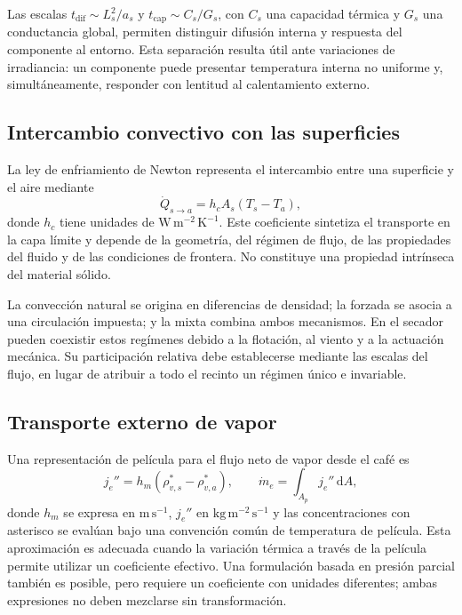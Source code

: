 Las escalas $t_{\mathrm{dif}}\sim L_s^2/a_s$ y $t_{\mathrm{cap}}\sim C_s/G_s$, con $C_s$ una capacidad térmica y $G_s$ una conductancia global, permiten distinguir difusión interna y respuesta del componente al entorno. Esta separación resulta útil ante variaciones de irradiancia: un componente puede presentar temperatura interna no uniforme y, simultáneamente, responder con lentitud al calentamiento externo.

\subsection{Intercambio convectivo con las superficies}

La ley de enfriamiento de Newton representa el intercambio entre una superficie y el aire mediante
\begin{equation}
\dot Q_{s\rightarrow a}=h_c A_s(T_s-T_a),
\label{eq:newton}
\end{equation}
donde $h_c$ tiene unidades de $\mathrm{W\,m^{-2}\,K^{-1}}$. Este coeficiente sintetiza el transporte en la capa límite y depende de la geometría, del régimen de flujo, de las propiedades del fluido y de las condiciones de frontera. No constituye una propiedad intrínseca del material sólido.

La convección natural se origina en diferencias de densidad; la forzada se asocia a una circulación impuesta; y la mixta combina ambos mecanismos. En el secador pueden coexistir estos regímenes debido a la flotación, al viento y a la actuación mecánica. Su participación relativa debe establecerse mediante las escalas del flujo, en lugar de atribuir a todo el recinto un régimen único e invariable.

\subsection{Transporte externo de vapor}

Una representación de película para el flujo neto de vapor desde el café es
\begin{equation}
j_e''=h_m\left(\rho_{v,s}^{*}-\rho_{v,a}^{*}\right),
\qquad
\dot m_e=\int_{A_p}j_e''\,\mathrm{d}A,
\label{eq:flujo_evaporacion}
\end{equation}
donde $h_m$ se expresa en $\mathrm{m\,s^{-1}}$, $j_e''$ en $\mathrm{kg\,m^{-2}\,s^{-1}}$ y las concentraciones con asterisco se evalúan bajo una convención común de temperatura de película. Esta aproximación es adecuada cuando la variación térmica a través de la película permite utilizar un coeficiente efectivo. Una formulación basada en presión parcial también es posible, pero requiere un coeficiente con unidades diferentes; ambas expresiones no deben mezclarse sin transformación.

